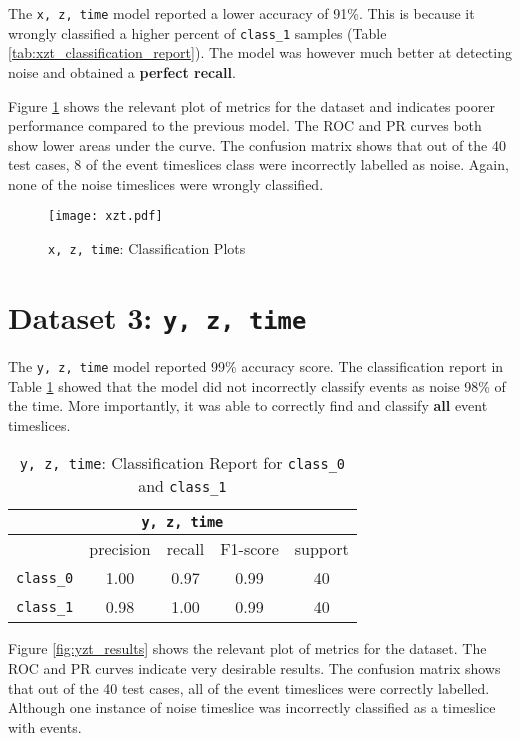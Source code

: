 The \texttt{x, z, time} model reported a lower accuracy of 91\%. This is because it wrongly classified a higher percent of \texttt{class\_1} samples (Table \ref{tab:xzt_classification_report}). The model was however much better at detecting noise and obtained a \textbf{perfect recall}.

Figure \ref{fig:xzt_results} shows the relevant plot of metrics for the dataset and indicates poorer performance compared to the previous model. The ROC and PR curves both show lower areas under the curve. The confusion matrix shows that out of the 40 test cases, 8 of the event timeslices class were incorrectly labelled as noise. Again, none of the noise timeslices were wrongly classified. 

\begin{figure}[ht!]
    \centering
    \texttt{[image: xzt.pdf]}
    \caption{\texttt{x, z, time}: Classification Plots}
    \label{fig:xzt_results}
\end{figure}

\section{Dataset 3: \texttt{y, z, time}}
The \texttt{y, z, time} model reported 99\% accuracy score. The classification report in Table \ref{tab:yzt_classification_report} showed that the model did not incorrectly classify events as noise 98\% of the time. More importantly, it was able to correctly find and classify \textbf{all} event timeslices. 

\begin{table} [ht!]
    \centering
    \begin{tabular}{l c c c c}
    \hline
    \multicolumn{5}{c}{\texttt{y, z, time}} \\
    \hline
                     & precision & recall & F1-score & support \\
        \texttt{class\_0} & 1.00 &  0.97    & 0.99 & 40\\
        \texttt{class\_1} & 0.98 &  1.00    & 0.99 & 40\\
    \hline
    \end{tabular}
    \caption{\texttt{y, z, time}: Classification Report for \texttt{class\_0} and \texttt{class\_1}}
    \label{tab:yzt_classification_report}
\end{table}

Figure \ref{fig:yzt_results} shows the relevant plot of metrics for the dataset. The ROC and PR curves indicate very desirable results. The confusion matrix shows that out of the 40 test cases, all of the event timeslices were correctly labelled. Although one instance of noise timeslice was incorrectly classified as a timeslice with events. 

